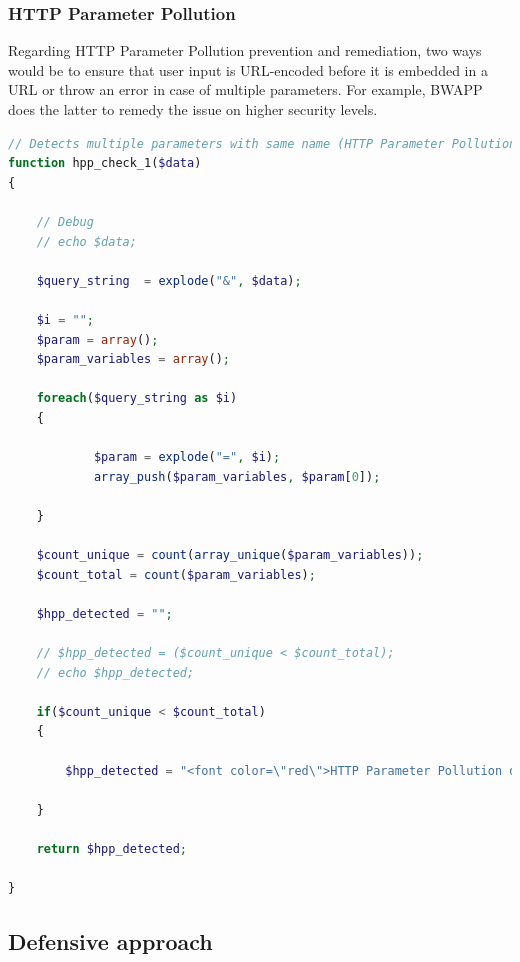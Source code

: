 \documentclass{article}
\begin{document}
\subsubsection{HTTP Parameter Pollution}
Regarding HTTP Parameter Pollution prevention and remediation, two ways would be to ensure that user input is URL-encoded before it is embedded in a URL or throw an error in case of multiple parameters. For example, BWAPP does the latter to remedy the issue on higher security levels.
\begin{lstlisting}[language=php,caption={HTTPPP Code},label=php:httppp-code]
// Detects multiple parameters with same name (HTTP Parameter Pollution)
function hpp_check_1($data)
{

    // Debug
    // echo $data;
   
    $query_string  = explode("&", $data);    

    $i = "";
    $param = array();
    $param_variables = array();

    foreach($query_string as $i)
    {

            $param = explode("=", $i);
            array_push($param_variables, $param[0]);

    }

    $count_unique = count(array_unique($param_variables));
    $count_total = count($param_variables);
    
    $hpp_detected = "";

    // $hpp_detected = ($count_unique < $count_total);
    // echo $hpp_detected;
    
    if($count_unique < $count_total)
    {

        $hpp_detected = "<font color=\"red\">HTTP Parameter Pollution detected!</font>";

    }

    return $hpp_detected;

}
\end{lstlisting}


\subsection{Defensive approach}
\end{document}
